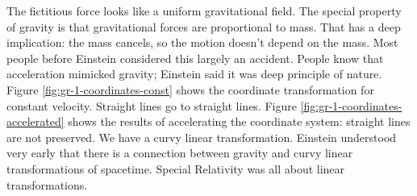 \documentclass[]{article}
\begin{document}
The fictitious force looks like a uniform gravitational field. The special property of gravity is that gravitational forces are proportional to mass. That has a deep implication: the mass cancels, so the motion doesn't depend on the mass. Most people before Einstein considered this largely an accident. People know that acceleration mimicked gravity; Einstein said it was deep principle of nature. Figure \ref{fig:gr-1-coordinates-const} shows the coordinate transformation for constant velocity. Straight lines go to straight lines. Figure \ref{fig:gr-1-coordinates-accelerated} shows the results of accelerating the coordinate system: straight lines are not preserved. We have a curvy linear transformation. Einstein understood very early that there is a connection between gravity and curvy linear transformations of spacetime. Special Relativity was all about linear transformations\cite{susskind2017special}.
\end{document}
